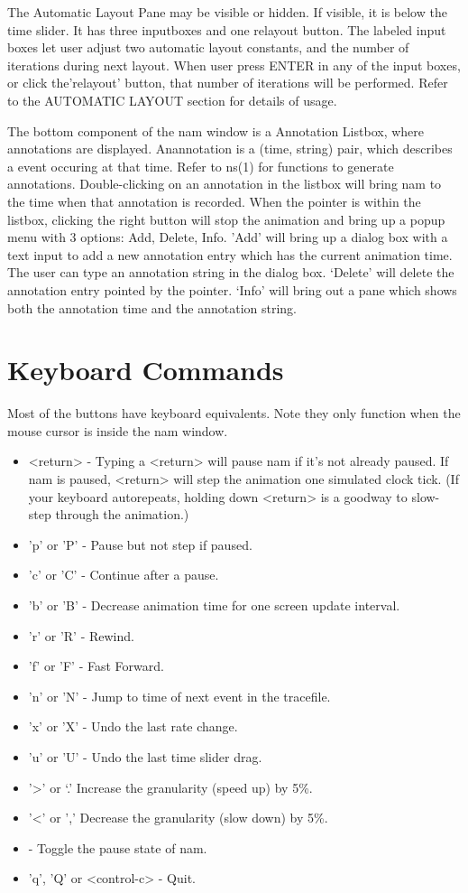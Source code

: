 The Automatic Layout Pane may be visible or hidden. If visible, it is below the time slider. It has three inputboxes and one relayout button. The labeled input boxes let user adjust two automatic layout constants, and the number of iterations during next layout. When user press ENTER in any of the input boxes, or click the'relayout' button, that number of iterations will be performed. Refer to the AUTOMATIC LAYOUT section for details of usage.

 The bottom component of the nam window is a Annotation Listbox, where annotations are displayed. Anannotation is a (time, string) pair, which describes a event occuring at that time. Refer to ns(1) for functions to generate annotations. Double-clicking on an annotation in the listbox will bring nam to the time when that annotation is recorded. When the pointer is within the listbox,  clicking the right button will stop the animation and bring up a popup menu with 3 options: Add, Delete, Info. 'Add' will bring up a dialog box with a text input to add a new annotation entry which has the current animation time. The user can type an annotation string in the dialog box. `Delete' will delete the annotation entry pointed by the pointer. `Info' will bring out a pane which shows both the annotation time and the annotation string.

\section{Keyboard Commands}
\label{sec:keyboardcommands}
Most of the buttons have keyboard equivalents. Note they only function when the mouse cursor is inside the nam window.

\begin{itemize}
\item <return> - Typing a <return> will pause nam if it's not already paused. If nam is paused, <return> will step the animation one simulated clock tick. (If your keyboard autorepeats, holding down <return> is a goodway to slow-step through the animation.)
\item 'p' or 'P' - Pause but not step if paused.
\item 'c' or 'C' - Continue after a pause.
\item 'b' or 'B' - Decrease animation time for one screen update interval.
\item 'r' or 'R' - Rewind.
\item 'f' or 'F' - Fast Forward.
\item 'n' or 'N' - Jump to time of next event in the tracefile.
\item 'x' or 'X' - Undo the last rate change.
\item 'u' or 'U' - Undo the last time slider drag.
\item '>' or `.' Increase the granularity (speed up) by 5\%.
\item '<' or ',' Decrease the granularity (slow down) by 5\%.
\item <space bar> -  Toggle the pause state of nam. 
\item 'q', 'Q' or <control-c> - Quit.
\end{itemize}

